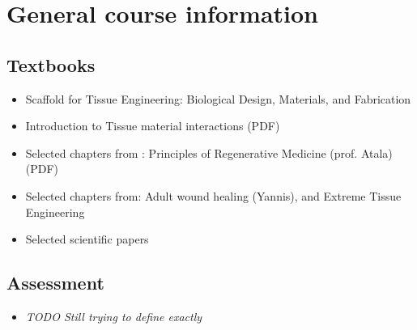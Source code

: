 \chapter{General course information}
  \section{Textbooks}
    \begin{itemize}
      \item Scaffold for Tissue Engineering: Biological Design, Materials, and Fabrication
      \item Introduction to Tissue material interactions (PDF)
      \item Selected chapters from : Principles of Regenerative Medicine (prof. Atala) (PDF)
      \item Selected chapters from: Adult wound healing (Yannis), and Extreme Tissue Engineering
      \item Selected scientific papers
    \end{itemize}

  \section{Assessment}
    \begin{itemize}
      \item \textit{TODO Still trying to define exactly}
    \end{itemize}

